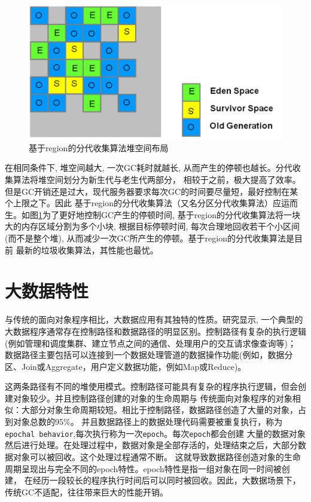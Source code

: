 \begin{figure}[h]
    \centering
    \includegraphics[width=12cm]{figure/region-based-gc.png}
    \caption{基于region的分代收集算法堆空间布局\cite{G1}}
    \label{jvm_region-gc}
\end{figure}
在相同条件下, 堆空间越大, 一次GC耗时就越长, 从而产生的停顿也越长。分代收集算法将堆空间划分为新生代与老生代两部分，
相较于之前，极大提高了效率。但是GC开销还是过大，现代服务器要求每次GC的时间要尽量短，最好控制在某个上限之下。因此
基于region的分代收集算法（又名分区分代收集算法）应运而生。如图\ref{jvm_region-gc}为了更好地控制GC产生的停顿时间, 基于region的分代收集算法将一块大的内存区域分割为多个小块, 
根据目标停顿时间, 每次合理地回收若干个小区间(而不是整个堆), 从而减少一次GC所产生的停顿。基于region的分代收集算法是目前
最新的垃圾收集算法，其性能也最忧。

\section{大数据特性}
与传统的面向对象程序相比，大数据应用有其独特的性质。研究\cite{gog2015broom,nguyen2015facade,bu2013bloat}显示,
一个典型的大数据程序通常存在控制路径和数据路径的明显区别。控制路径有复杂的执行逻辑(例如管理和调度集群、建立节点之间的通信、处理用户的交互请求像查询等)；
数据路径主要包括可以连接到一个数据处理管道的数据操作功能(例如，数据分区、Join或Aggregate，用户定义数据功能，例如Map或Reduce)。

这两条路径有不同的堆使用模式。控制路径可能具有复杂的程序执行逻辑，但会创建对象较少。并且控制路径创建的对象的生命周期与
传统面向对象程序的对象相似：大部分对象生命周期较短。相比于控制路径，数据路径创造了大量的对象，占到对象总数的95\%\cite{bu2013bloat}。
并且数据路径上的数据处理代码需要被重复执行，称为\texttt{epochal behavior},每次执行称为一次\texttt{epoch}。每次\texttt{epoch}都会创建
大量的数据对象然后进行处理。在处理过程中，数据对象是全部存活的，处理结束之后，大部分数据对象可以被回收。这个处理过程通常不断。
这就导致数据路径创造对象的生命周期呈现出与完全不同的epoch特性。epoch特性是指一组对象在同一时间被创建，
在经历一段较长的程序执行时间后可以同时被回收。因此，大数据场景下，传统GC不适配，往往带来巨大的性能开销。




